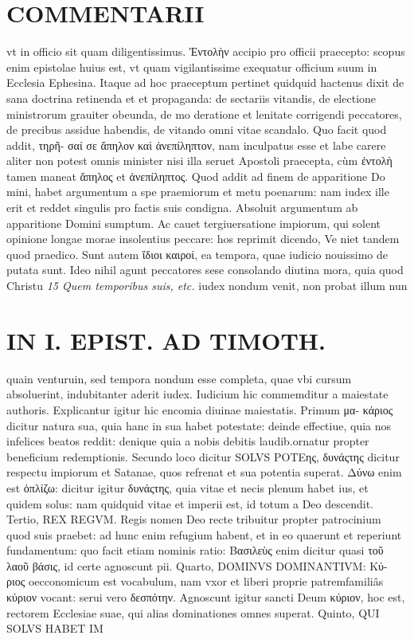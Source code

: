 \documentclass{article}
\begin{document}
\begin{pages}
\section*{COMMENTARII }
\marginpar{[ p.164 ]}\pstart vt in officio sit quam diligentissimus. Ἐντολὴν accipio pro officii praecepto: scopus enim epistolae huius est, vt quam vigilantissime exequatur officium suum in Ecclesia Ephesina. Itaque ad hoc praeceptum pertinet quidquid hactenus dixit de sana doctrina retinenda et et propaganda: de sectariis vitandis, de electione ministrorum grauiter obeunda, de mo deratione et lenitate corrigendi peccatores, de precibus assidue habendis, de vitando omni vitae scandalo. Quo facit quod addit, τηρῆ- σαί σε ἄπηλον καὶ ἀνεπίληπτον, nam inculpatus esse et labe carere aliter non potest omnis minister nisi illa seruet Apostoli praecepta, cùm ἐντολὴ tamen maneat ἄπηλος et ἀνεπίληπτος. Quod addit ad finem de apparitione Do mini, habet argumentum a spe praemiorum et metu poenarum: nam iudex ille erit et reddet singulis pro factis suis condigna. Absoluit argumentum ab apparitione Domini sumptum. Ac cauet tergiuersatione impiorum, qui solent opinione longae morae insolentius peccare: hos reprimit dicendo, Ve niet tandem quod praedico. Sunt autem ἵδιοι καιροί, ea tempora, quae iudicio nouissimo de putata sunt. Ideo nihil agunt peccatores sese consolando diutina mora, quia quod Christu  \pend
\textit{15 Quem temporibus suis, etc. }\pstart iudex nondum venit, non probat illum nun\pend
\section*{IN I. EPIST. AD TIMOTH. }
\marginpar{[ p.165 ]}\pstart quain venturuin, sed tempora nondum esse completa, quae vbi cursum absoluerint, indubitanter aderit iudex. Iudicium hic commemditur a maiestate authoris. Explicantur igitur hic encomia diuinae maiestatis. Primum μα- κάριος dicitur natura sua, quia hanc in sua habet potestate: deinde effectiue, quia nos infelices beatos reddit: denique quia a nobis debitis laudib.ornatur propter beneficium redemptionis. Secundo loco dicitur SOLVS POΤEης, δυνάςτης dicitur respectu impiorum et Satanae, quos refrenat et sua potentia superat. Δύνω enim est ὁπλίζω: dicitur igitur δυνάςτης, quia vitae et necis plenum habet ius, et quidem solus: nam quidquid vitae et imperii est, id totum a Deo descendit. Tertio, REX REGVM. Regis nomen Deo recte tribuitur propter patrocinium quod suis praebet: ad hunc enim refugium habent, et in eo quaerunt et reperiunt fundamentum: quo facit etiam nominis ratio: Βασιλεὺς enim dicitur quasi τοῦ λαοῦ βάσις, id certe agnoscunt pii.  \pend\pstart Quarto, DOMINVS DOMINANTIVM: Κύ- ριος oecconomicum est vocabulum, nam vxor et liberi proprie patremfamiliâs κύριον vocant: serui vero δεσπότην. Agnoscunt igitur sancti Deum κύριον, hoc est, rectorem Ecclesiae suae, qui alias dominationes omnes superat.  \pend\pstart Quinto, QUI SOLVS HABET IM\pend

\end{pages}
\end{document}
